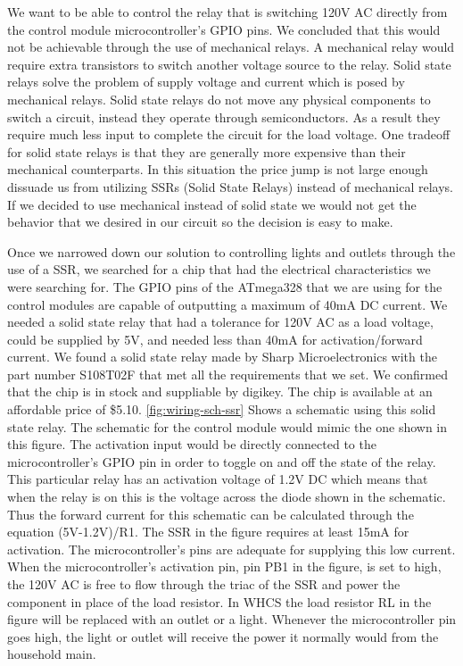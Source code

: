 We want to be able to control the relay that is switching 120V AC directly from
the control module microcontroller{}'s GPIO pins. We concluded that this would
not be achievable through the use of mechanical relays. A mechanical relay
would require extra transistors to switch another voltage source to the relay.
Solid state relays solve the problem of supply voltage and current which is
posed by mechanical relays. Solid state relays do not move any physical
components to switch a circuit, instead they operate through semiconductors. As
a result they require much less input to complete the circuit for the load
voltage. One tradeoff for solid state relays is that they are generally more
expensive than their mechanical counterparts. In this situation the price jump
is not large enough dissuade us from utilizing SSRs (Solid State Relays)
instead of mechanical relays. If we decided to use mechanical instead of solid
state we would not get the behavior that we desired in our circuit so the
decision is easy to make.

Once we narrowed down our solution to controlling lights and outlets through
the use of a SSR, we searched for a chip that had the electrical
characteristics we were searching for. The GPIO pins of the ATmega328 that we
are using for the control modules are capable of outputting a maximum of 40mA
DC current. We needed a solid state relay that had a tolerance for 120V AC as a
load voltage, could be supplied by 5V, and needed less than 40mA for
activation/forward current. We found a solid state relay made by Sharp
Microelectronics with the part number S108T02F that met all the requirements
that we set. We confirmed that the chip is in stock and suppliable by digikey.
The chip is available at an affordable price of \$5.10. \autoref{fig:wiring-sch-ssr}
Shows a schematic using this solid state relay. The schematic for the control
module would mimic the one shown in this figure. The activation input would be
directly connected to the microcontroller{}'s GPIO pin in order to toggle on
and off the state of the relay. This particular relay has an activation voltage
of 1.2V DC which means that when the relay is on this is the voltage across the
diode shown in the schematic. Thus the forward current for this schematic can
be calculated through the equation (5V{}-1.2V)/R1. The SSR in the figure
requires at least 15mA for activation. The microcontroller{}'s pins are
adequate for supplying this low current. When the microcontroller{}'s
activation pin, pin PB1 in the figure, is set to high, the 120V AC is free to
flow through the triac of the SSR and power the component in place of the load
resistor. In WHCS the load resistor RL in the figure will be replaced with an
outlet or a light. Whenever the microcontroller pin goes high, the light or
outlet will receive the power it normally would from the household main.

